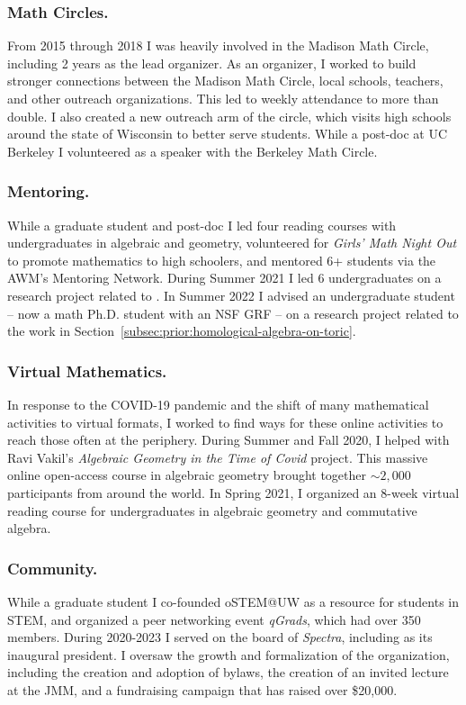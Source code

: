 \documentclass[11pt,reqno]{amsart}
\theoremstyle{remark}
\begin{document}
\subsubsection{Math Circles.}
	From 2015 through 2018 I was heavily involved in the Madison Math Circle, including  2 years as the lead organizer. As an organizer, I worked to build stronger connections between the Madison Math Circle, local schools, teachers, and other outreach organizations. This led to weekly attendance to more than double. I also created a new outreach arm of the circle, which visits high schools around the state of Wisconsin to better serve students. While a post-doc at UC Berkeley I volunteered as a speaker with the Berkeley Math Circle. 

\subsubsection{Mentoring.} While a graduate student and post-doc I led four reading courses with undergraduates in algebraic and geometry, volunteered for \textit{Girls' Math Night Out} to promote mathematics to high schoolers, and mentored 6+ students via the AWM's Mentoring Network. During Summer 2021 I led 6 undergraduates on a research project related to \cite{BBCMMW24}. In Summer 2022 I advised an undergraduate student -- now a math Ph.D. student with an NSF GRF -- on a research project related to the work in Section~\ref{subsec:prior:homological-algebra-on-toric}. 
\subsubsection{Virtual Mathematics.}
In response to the COVID-19 pandemic and the shift of many mathematical activities to virtual formats, I worked to find ways for these online activities to reach those often at the periphery. During Summer and Fall 2020, I helped with Ravi Vakil's \textit{Algebraic Geometry in the Time of Covid} project. This massive online open-access course in algebraic geometry brought together $\sim2,000$ participants from around the world. In Spring 2021, I organized an 8-week virtual reading course for undergraduates in algebraic geometry and commutative algebra. 

\subsubsection{Community.} While a graduate student I co-founded oSTEM@UW as a resource for students in STEM, and organized a peer networking event \textit{qGrads}, which had over 350 members. During 2020-2023 I served on the board of \textit{Spectra}, including as its inaugural president. I oversaw the growth and formalization of the organization, including the creation and adoption of bylaws, the creation of an invited lecture at the JMM, and a fundraising campaign that has raised over \$20,000.
\end{document}
